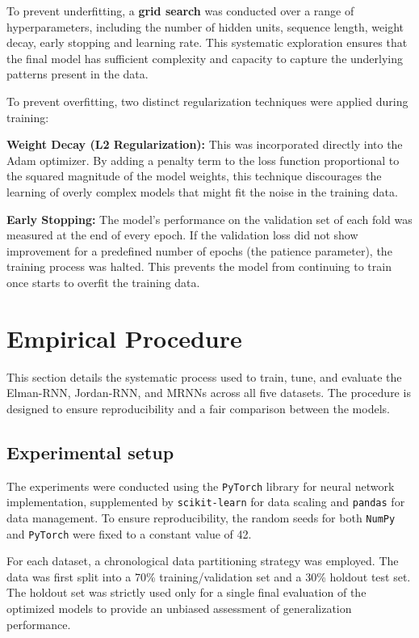 \documentclass[conference, 10pt]{IEEEtran}
\begin{document}
To prevent underfitting, a \textbf{grid search} was conducted over a range of hyperparameters, including the number of hidden
units, sequence length, weight decay, early stopping and learning rate. This systematic exploration ensures that the
final model has sufficient complexity and capacity to capture the underlying patterns present in the data.

To prevent overfitting, two distinct regularization techniques were applied during training:

\textbf{Weight Decay (L2 Regularization):} This was incorporated directly into the Adam optimizer. By adding a penalty term to
the loss function proportional to the squared magnitude of the model weights, this technique discourages the learning of
overly complex models that might fit the noise in the training data.

\textbf{Early Stopping:} The model's performance on the validation set of each fold was measured at the end of every epoch. If
the validation loss did not show improvement for a predefined number of epochs (the patience parameter), the training
process was halted. This prevents the model from continuing to train once starts to overfit the training data.

\section{Empirical Procedure}
This section details the systematic process used to train, tune, and evaluate the Elman-RNN, Jordan-RNN, and MRNNs across all
five datasets. The procedure is designed to ensure reproducibility and a fair comparison between the models.

\subsection{Experimental setup}
The experiments were conducted using the \texttt{PyTorch} library for neural network implementation, supplemented by \texttt{scikit-learn}
for data scaling and \texttt{pandas} for data management. To ensure reproducibility, the random seeds for both \texttt{NumPy} and \texttt{PyTorch}
were fixed to a constant value of 42.

For each dataset, a chronological data partitioning strategy was employed. The data was first split into a 70\%
training/validation set and a 30\% holdout test set. The holdout set was strictly used only for a single final evaluation
of the optimized models to provide an unbiased assessment of generalization performance.
\end{document}

